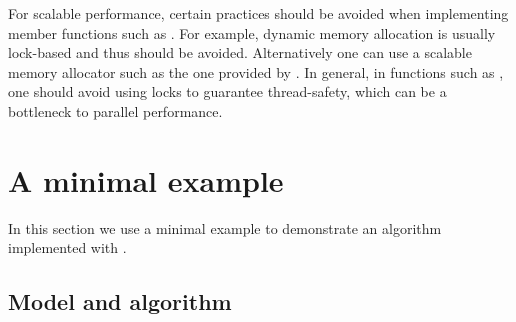 For scalable performance, certain practices should be avoided when
implementing member functions such as . For example, dynamic
memory allocation is usually lock-based and thus should be avoided.
Alternatively one can use a scalable memory allocator such as the one provided
by \tbb. In general, in functions such as , one should avoid
using locks to guarantee thread-safety, which can be a bottleneck to parallel
performance.


\section{A minimal example}
\label{sec:A minimal example}

In this section we use a minimal example to demonstrate an \smc algorithm
implemented with \vsmc.

\subsection{Model and algorithm}
\label{sub:Model and algorithm}

